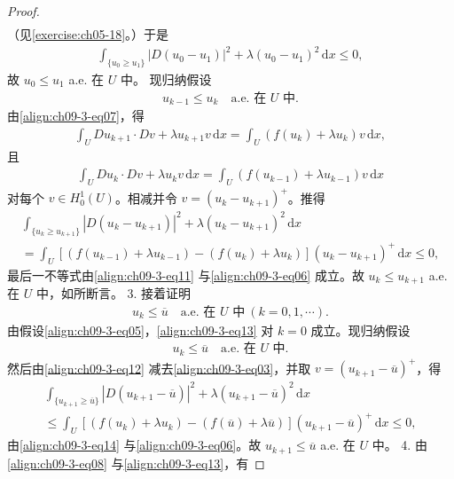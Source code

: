 \documentclass[../../main.tex]{subfiles}
\begin{document}
\begin{theorem}[上下解之间解的存在性]
\begin{proof}
\begin{align*}
\end{align*}
（见\cref{exercise:ch05-18}。）于是
\begin{align*}
\int_{\{u_0\geqslant u_1\}}|D(u_0-u_1)|^2+\lambda(u_0-u_1)^2\,\mathrm{d}x\leqslant 0,
\end{align*}
故 $u_0\leqslant u_1$ a.e. 在 $U$ 中。
现归纳假设
\begin{align}
u_{k-1}\leqslant u_k\quad\text{a.e. 在 }U\text{ 中}.\label{align:ch09-3-eq11}
\end{align}
由\eqref{align:ch09-3-eq07}，得
\begin{align}
\int_U Du_{k+1}\cdot Dv+\lambda u_{k+1}v\,\mathrm{d}x=\int_U(f(u_k)+\lambda u_k)v\,\mathrm{d}x,\label{align:ch09-3-eq12}
\end{align}
且
\begin{align*}
\int_U Du_k\cdot Dv+\lambda u_kv\,\mathrm{d}x=\int_U(f(u_{k-1})+\lambda u_{k-1})v\,\mathrm{d}x
\end{align*}
对每个 $v\in H_0^1(U)$。相减并令 $v=(u_k-u_{k+1})^+$。推得
\begin{align*}
\int_{\{u_k\geqslant u_{k+1}\}}|D(u_k-u_{k+1})|^2+\lambda(u_k-u_{k+1})^2\,\mathrm{d}x\\
=\int_U[(f(u_{k-1})+\lambda u_{k-1})-(f(u_k)+\lambda u_k)](u_k-u_{k+1})^+\,\mathrm{d}x\leqslant 0,
\end{align*}
最后一不等式由\eqref{align:ch09-3-eq11} 与\eqref{align:ch09-3-eq06} 成立。故 $u_k\leqslant u_{k+1}$ a.e. 在 $U$ 中，如所断言。
3. 接着证明
\begin{align}
u_k\leqslant\overline{u}\quad\text{a.e. 在 }U\text{ 中}\ (k=0,1,\cdots).\label{align:ch09-3-eq13}
\end{align}
由假设\eqref{align:ch09-3-eq05}，\eqref{align:ch09-3-eq13} 对 $k=0$ 成立。现归纳假设
\begin{align}
u_k\leqslant\overline{u}\quad\text{a.e. 在 }U\text{ 中}.\label{align:ch09-3-eq14}
\end{align}
然后由\eqref{align:ch09-3-eq12} 减去\eqref{align:ch09-3-eq03}，并取 $v=(u_{k+1}-\overline{u})^+$，得
\begin{align*}
\int_{\{u_{k+1}\geqslant\overline{u}\}}|D(u_{k+1}-\overline{u})|^2+\lambda(u_{k+1}-\overline{u})^2\,\mathrm{d}x\\
\leqslant\int_U[(f(u_k)+\lambda u_k)-(f(\overline{u})+\lambda\overline{u})](u_{k+1}-\overline{u})^+\,\mathrm{d}x\leqslant 0,
\end{align*}
由\eqref{align:ch09-3-eq14} 与\eqref{align:ch09-3-eq06}。故 $u_{k+1}\leqslant\overline{u}$ a.e. 在 $U$ 中。
4. 由\eqref{align:ch09-3-eq08} 与\eqref{align:ch09-3-eq13}，有

\end{proof}
\end{theorem}
\end{document}
